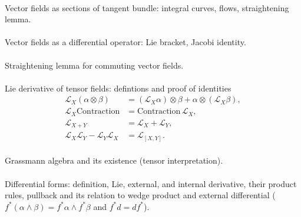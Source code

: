 \documentclass{article}
\begin{document}
 
\paragraph{} Vector fields as sections of tangent bundle:
integral curves, flows, straightening lemma.


\paragraph{} Vector fields as a differential operator: Lie bracket, Jacobi identity.


\paragraph{} Straightening lemma for commuting vector fields.


\paragraph{}
Lie derivative of tensor fields: defintions and proof of identities
\[\begin{split}
\mathcal{L}_X(\alpha\otimes\beta)&=(\mathcal{L}_X\alpha)\otimes\beta+\alpha\otimes(\mathcal{L}_X\beta),
\\
\mathcal{L}_{X}\mathrm{Contraction}&=\mathrm{Contraction}\,\mathcal{L}_{X},
\\
\mathcal{L}_{X+Y}&=\mathcal{L}_X+\mathcal{L}_Y,
\\
\mathcal{L}_{X}\mathcal{L}_{Y}-\mathcal{L}_{Y}\mathcal{L}_{X}&=\mathcal{L}_{[X,Y]}.
\end{split}
\]


\paragraph{}
Grassmann algebra and its existence (tensor interpretation).


\paragraph{} Differential forms: definition, Lie, external, and internal derivative,  their product rules, pullback and its relation to wedge product and external differential ($f^*(\alpha\wedge\beta)=f^*\alpha\wedge f^*\beta$ and $f^*d=d f^*$).
\end{document}
